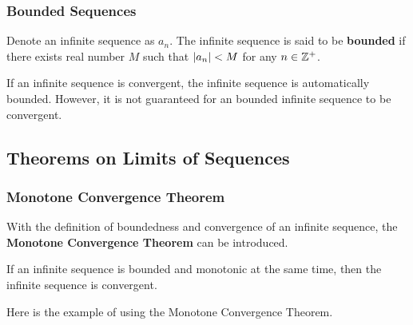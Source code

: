 \documentclass[a4paper,12pt]{article}
\begin{document}
\subsubsection{Bounded Sequences}
\begin{dft}
  Denote an infinite sequence as $a_{n}$. The infinite sequence is said to be \textbf{bounded} if there exists real number $M$ such that $\left| a_{n}\right|<M$ for any $n\in\mathbb{Z}^{+}$.
\end{dft}\n

If an infinite sequence is convergent, the infinite sequence is automatically bounded. However, it is not guaranteed for an bounded infinite sequence to be convergent.

\subsection{Theorems on Limits of Sequences}
\subsubsection{Monotone Convergence Theorem}
With the definition of boundedness and convergence of an infinite sequence, the \textbf{Monotone Convergence Theorem} can be introduced.\n

\begin{thm}
  If an infinite sequence is bounded and monotonic at the same time, then the infinite sequence is convergent.
\end{thm}\n

Here is the example of using the Monotone Convergence Theorem.\n
\end{document}

